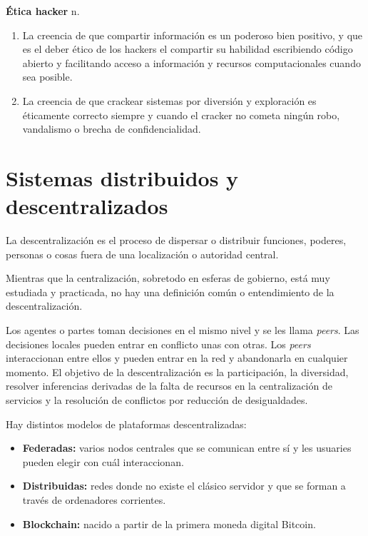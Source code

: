 \textbf{Ética hacker} n.
\begin{enumerate}[label=\textbf{\arabic*.}]
    \item La creencia de que compartir información es un poderoso bien positivo, y que es el deber ético de los hackers el compartir su habilidad escribiendo código abierto y facilitando acceso a información y recursos computacionales cuando sea posible.
    \item La creencia de que crackear sistemas por diversión y exploración es éticamente correcto siempre y cuando el cracker no cometa ningún robo, vandalismo o brecha de confidencialidad.
\end{enumerate}

\section{Sistemas distribuidos y descentralizados}

La descentralización es el proceso de dispersar o distribuir funciones, poderes, personas o cosas fuera de una localización o autoridad central.

Mientras que la centralización, sobretodo en esferas de gobierno, está muy estudiada y practicada, no hay una definición común o entendimiento de la descentralización.

Los agentes o partes toman decisiones en el mismo nivel y se les llama \textit{peers}. Las decisiones locales pueden entrar en conflicto unas con otras. Los \textit{peers} interaccionan entre ellos y pueden entrar en la red y abandonarla en cualquier momento. El objetivo de la descentralización es la participación, la diversidad, resolver inferencias derivadas de la falta de recursos en la centralización de servicios y la resolución de conflictos por reducción de desigualdades.

Hay distintos modelos de plataformas descentralizadas:
\begin{itemize}
    \item\textbf{Federadas:} varios nodos centrales que se comunican entre sí y les usuaries pueden elegir con cuál interaccionan.
    \item\textbf{Distribuidas:} redes donde no existe el clásico servidor y que se forman a través de ordenadores corrientes.
    \item\textbf{Blockchain:} nacido a partir de la primera moneda digital Bitcoin.
\end{itemize}
